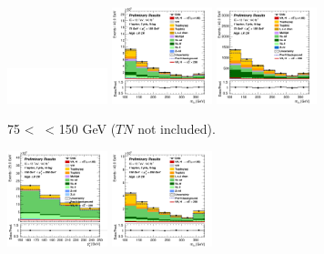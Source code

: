 \begin{figure}[h!]
    \centering
    \begin{subfigure}[b]{\textwidth}
        \centering
        \includegraphics[width=0.32\textwidth]{Images/VH/Own_fit/blank.png}
        \includegraphics[width=0.32\textwidth]{Images/VH/Own_fit/postfit_VHcc/Region_distmBB_BMax150_BMin75_DCRHigh_J3_TTypelt_T2_L1_Y6051_GlobalFit_conditionnal_mu1.png}
        \includegraphics[width=0.32\textwidth]{Images/VH/Own_fit/postfit_VHcc/Region_distmBB_BMax150_BMin75_DCRHigh_J3_TTypett_T2_L1_Y6051_GlobalFit_conditionnal_mu1.png}
        \caption{75 < \ptv\ < 150 GeV ($TN$ not included).}
        \label{fig:plots_VHcc_1L_75_CRH_3J}
    \end{subfigure}
    \begin{subfigure}[b]{\textwidth}
        \centering
        \includegraphics[width=0.32\textwidth]{Images/VH/Own_fit/postfit_VHcc/Region_distpTV_BMax250_BMin150_DCRHigh_J3_TTypent_T1_L1_Y6051_GlobalFit_conditionnal_mu1.png}
        \includegraphics[width=0.32\textwidth]{Images/VH/Own_fit/postfit_VHcc/Region_distmBB_BMax250_BMin150_DCRHigh_J3_TTypelt_T2_L1_Y6051_GlobalFit_conditionnal_mu1.png}

\end{subfigure}
\end{figure}
